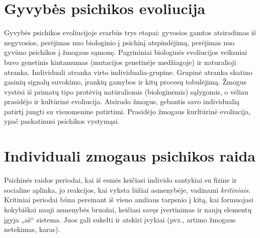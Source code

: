 \section{Gyvybės psichikos evoliucija}

\label{tema:gyvybes_psichikos_evoliucija}

Gyvybės psichikos evoliucijoje svarbūs trys etapai: gyvosios gamtos 
atsiradimas iš negyvosios, perėjimas nuo biologinio į psichinį atspindėjimą,
perėjimas nuo gyvūno psichikos į žmogaus sąmonę.
Pagrininiai biologinės evoliucijos veiksniai buvo genetinis kintamumas
(mutacijos genetinėje medžiagoje) ir naturalioji atranka. Individuali 
atranka virto individualia-grupine. Grupinė atranka skatino gasinių signalų
suvokimo, įrankių gamybos ir kitų procesų tobulėjimą. Žmogus vystėsi iš 
primatų tipo protėvių natūraliomis (biologinėmis) sąlygomis, o vėliau 
prasidėjo ir kultūrinė evoliucija. Atsirado žmogus, gebantis savo 
individualią patirtį jungti su visuomenine patirtimi. Prasidėjo žmogaus
 kurltūrinė evoliucija, ypač paskatinusi psichikos vystymąsi.

\section{Individuali zmogaus psichikos raida}

\label{tema:psichikos_raida}

Psichinės raidos periodai, kai iš esmės keičiasi individo santykiai
su fizine ir socialine aplinka, jo reakcijos, kai vyksta lūžiai asmenybėje,
vadinami \emph{kritiniais}. Kritiniai periodai būna pereinant iš vieno 
amžiaus tarpsnio į kitą, kai formuojasi kokybiškai nauji asmenybės 
bruožai, keičiasi savęs įvertinimas ir naujų elementų įgyja „aš“ sistema.
Juos gali sukelti ir atskiri įvykiai (pvz., artimo žmogaus netekimas, karas).


